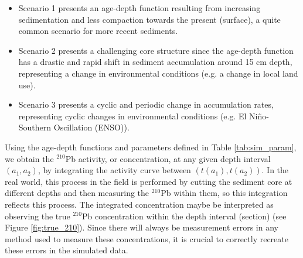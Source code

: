 \documentclass [10pt] {article}
\begin{document}
\begin{itemize}
	\item Scenario 1 presents an age-depth function resulting from increasing sedimentation and less compaction towards the present (surface), a quite common scenario for more recent sediments. 
	
	\item Scenario 2 presents a challenging core structure since the age-depth function has a drastic and rapid shift in sediment accumulation around 15 cm depth, representing a change in environmental conditions (e.g. a change in local land use).
 
	\item Scenario 3 presents a cyclic and periodic change in accumulation rates, representing cyclic changes in environmental conditions (e.g. El Niño-Southern Oscillation (ENSO)). 
\end{itemize} 

Using the age-depth functions and parameters defined in Table \ref{tab:sim_param}, we obtain the $^{210}$Pb activity, or concentration, at any given depth interval $(a_1,a_2)$, by integrating the activity curve between $(t(a_1),t(a_2))$.  
In the real world, this process in the field is performed by cutting the sediment core at different depths and then measuring the $^{210}$Pb within them, so this integration reflects this process.
The integrated concentration maybe be interpreted as observing the true $^{210}$Pb concentration within the depth interval (section)
(see Figure \ref{fig:true_210}).
Since there will always be measurement errors in any method used to measure these concentrations, it is crucial to correctly recreate these errors in the simulated data.

 
\end{document}
